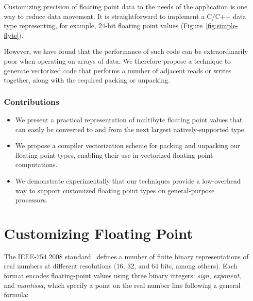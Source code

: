\documentclass{sig-alternate-05-2015}
\begin{document}
Customizing precision of floating point data to the needs of the application is
one way to reduce data movement. It is straightforward to implement a C/C++
data type representing, for example, 24-bit floating point values
(Figure~\ref{fig:simple-flyte}).

However, we have found that the performance of such code can be extraordinarily
poor when operating on arrays of data. We therefore propose a technique to
generate vectorized code that performs a number of adjacent reads or writes
together, along with the required packing or unpacking.



\subsubsection*{Contributions}

\begin{itemize}

\item We present a practical representation of multibyte floating
  point values that can easily be converted to and from the next
  largest natively-supported type.

\item We propose a compiler vectorization scheme for packing and
  unpacking our floating point types, enabling their use in vectorized floating
  point computations.





\item We demonstrate experimentally that our techniques provide a low-overhead
way to support customized floating point types on general-purpose processors.

\end{itemize}

















\section{Customizing Floating Point}
\label{sec:ieee-754-intro}

The IEEE-754 2008 standard~\cite{zuras2008ieee} defines a number of finite
binary representations of real numbers at different resolutions (16, 32, and 64
bits, among others). Each format encodes floating-point values using three
binary integers: \emph{sign}, \emph{exponent}, and \emph{mantissa}, which
specify a point on the real number line following a general formula:
\end{document}
